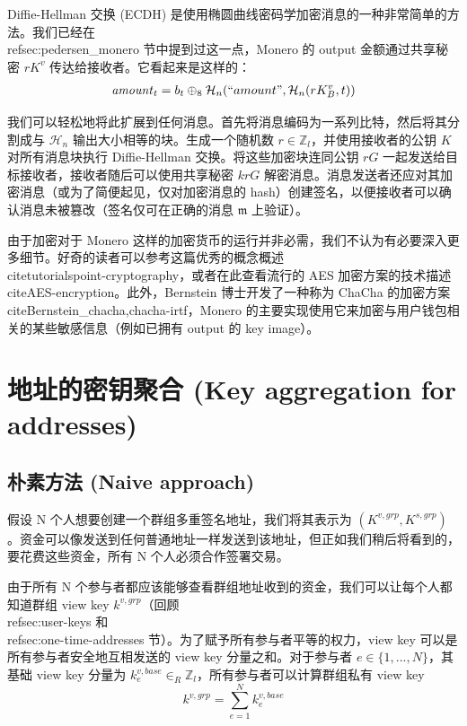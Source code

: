 Diffie-Hellman 交换 (ECDH) 是使用椭圆曲线密码学加密消息的一种非常简单的方法。我们已经在 \\ref{sec:pedersen_monero} 节中提到过这一点，Monero 的 output 金额通过共享秘密 $r K^v$ 传达给接收者。它看起来是这样的：\vspace{.175cm}
\begin{align*}
  \mathit{amount}_t = b_t \oplus_8 \mathcal{H}_n(``amount", \mathcal{H}_n(r K_B^v, t))
\end{align*}

我们可以轻松地将此扩展到任何消息。首先将消息编码为一系列比特，然后将其分割成与 $\mathcal{H}_n$ 输出大小相等的块。生成一个随机数 $r \in \mathbb{Z}_l$，并使用接收者的公钥 $K$ 对所有消息块执行 Diffie-Hellman 交换。将这些加密块连同公钥 $r G$ 一起发送给目标接收者，接收者随后可以使用共享秘密 $k r G$ 解密消息。消息发送者还应对其加密消息（或为了简便起见，仅对加密消息的 hash）创建签名，以便接收者可以确认消息未被篡改（签名仅可在正确的消息 $\mathfrak{m}$ 上验证）。

由于加密对于 Monero 这样的加密货币的运行并非必需，我们不认为有必要深入更多细节。好奇的读者可以参考这篇优秀的概念概述 \\cite{tutorialspoint-cryptography}，或者在此查看流行的 AES 加密方案的技术描述 \\cite{AES-encryption}。此外，Bernstein 博士开发了一种称为 ChaCha 的加密方案 \\cite{Bernstein_chacha,chacha-irtf}，Monero 的主要实现使用它来加密与用户钱包相关的某些敏感信息（例如已拥有 output 的 key image）。


\section{地址的密钥聚合 (Key aggregation for addresses)}
\label{sec:key-aggregation}

\subsection{朴素方法 (Naive approach)}
\label{sec:naive-key-aggregation}

假设 N 个人想要创建一个群组多重签名地址，我们将其表示为 $(K^{v,grp},K^{s,grp})$。资金可以像发送到任何普通地址一样发送到该地址，但正如我们稍后将看到的，要花费这些资金，所有 N 个人必须合作签署交易。

由于所有 N 个参与者都应该能够查看群组地址收到的资金，我们可以让每个人都知道群组 view key $k^{v,grp}$（回顾 \\ref{sec:user-keys} 和 \\ref{sec:one-time-addresses} 节）。为了赋予所有参与者平等的权力，view key 可以是所有参与者安全地互相发送的 view key 分量之和。对于参与者 $e \in \{1,...,N\}$，其基础 view key 分量为 $k^{v,base}_e \in_R \mathbb{Z}_l$，所有参与者可以计算群组私有 view key
\[k^{v,grp} = \sum^{N}_{e=1} k^{v,base}_e\]

